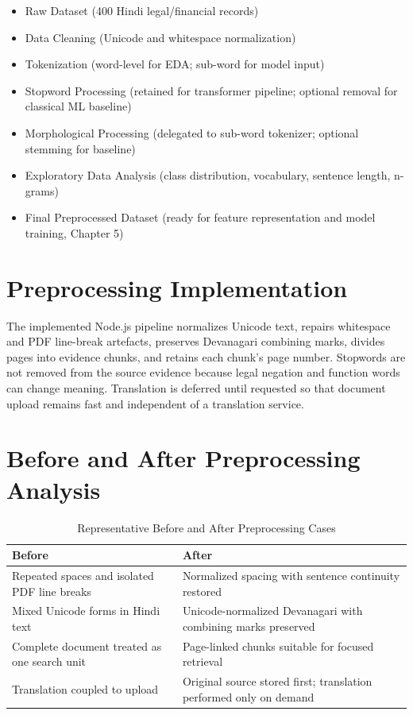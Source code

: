 \begin{itemize}

\item Raw Dataset (400 Hindi legal/financial records)

\item Data Cleaning (Unicode and whitespace normalization)

\item Tokenization (word-level for EDA; sub-word for model input)

\item Stopword Processing (retained for transformer pipeline; optional removal for classical ML baseline)

\item Morphological Processing (delegated to sub-word tokenizer; optional stemming for baseline)

\item Exploratory Data Analysis (class distribution, vocabulary, sentence length, n-grams)

\item Final Preprocessed Dataset (ready for feature representation and model training, Chapter 5)

\end{itemize}

\section{Preprocessing Implementation}

The implemented Node.js pipeline normalizes Unicode text, repairs whitespace and PDF line-break artefacts, preserves Devanagari combining marks, divides pages into evidence chunks, and retains each chunk's page number. Stopwords are not removed from the source evidence because legal negation and function words can change meaning. Translation is deferred until requested so that document upload remains fast and independent of a translation service.

\section{Before and After Preprocessing Analysis}

\begin{table}[H]
\centering
\caption{Representative Before and After Preprocessing Cases}
\begin{tabular}{|p{5.8cm}|p{7.2cm}|}
\hline
\textbf{Before} & \textbf{After} \\
\hline
Repeated spaces and isolated PDF line breaks & Normalized spacing with sentence continuity restored \\
\hline
Mixed Unicode forms in Hindi text & Unicode-normalized Devanagari with combining marks preserved \\
\hline
Complete document treated as one search unit & Page-linked chunks suitable for focused retrieval \\
\hline
Translation coupled to upload & Original source stored first; translation performed only on demand \\
\hline
\end{tabular}
\end{table}

